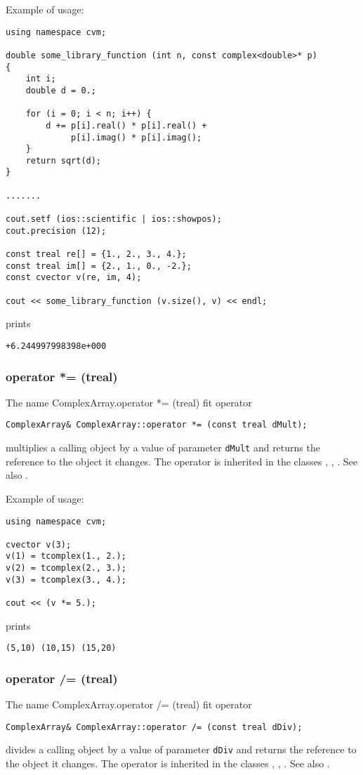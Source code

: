 Example of usage:
\begin{verbatim}
using namespace cvm;

double some_library_function (int n, const complex<double>* p)
{
    int i;
    double d = 0.;

    for (i = 0; i < n; i++) {
        d += p[i].real() * p[i].real() +
             p[i].imag() * p[i].imag();
    }
    return sqrt(d);
}

.......

cout.setf (ios::scientific | ios::showpos);
cout.precision (12);

const treal re[] = {1., 2., 3., 4.};
const treal im[] = {2., 1., 0., -2.};
const cvector v(re, im, 4);

cout << some_library_function (v.size(), v) << endl;
\end{verbatim}
prints
\begin{verbatim}
+6.244997998398e+000
\end{verbatim}
\newpage




\subsubsection{operator *= (treal)}
The%
\pdfdest name {ComplexArray.operator *= (treal)} fit{ }
operator
\begin{verbatim}
ComplexArray& ComplexArray::operator *= (const treal dMult);
\end{verbatim}
multiplies a calling object by a value of
parameter \verb"dMult" and returns the reference to
the object it changes.
The operator is inherited in the classes
,
,
.
See also .

Example of usage:
\begin{verbatim}
using namespace cvm;

cvector v(3);
v(1) = tcomplex(1., 2.);
v(2) = tcomplex(2., 3.);
v(3) = tcomplex(3., 4.);

cout << (v *= 5.);
\end{verbatim}
prints
\begin{verbatim}
(5,10) (10,15) (15,20)
\end{verbatim}
\newpage



\subsubsection{operator /= (treal)}
The%
\pdfdest name {ComplexArray.operator /= (treal)} fit{ }
operator
\begin{verbatim}
ComplexArray& ComplexArray::operator /= (const treal dDiv);
\end{verbatim}
divides a calling object by a value of
parameter \verb"dDiv" and returns the reference to
the object it changes.
The operator is inherited in the classes
,
,
.
See also .


